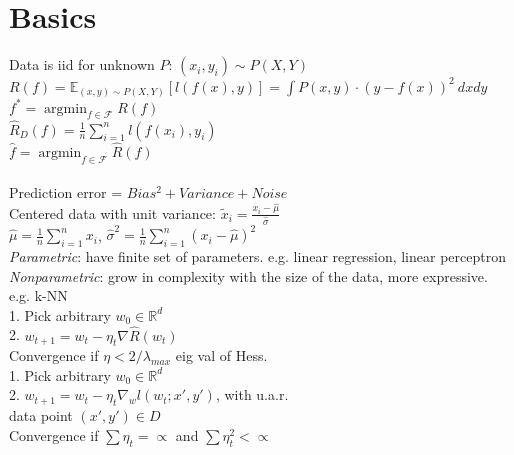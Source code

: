 
\section*{Basics}

Data is iid for unknown $P$: $(x_i, y_i) \sim P(X,Y)$\\
$R(f) = \mathbb{E}_{(x,y)\sim P(X,Y)}[l(f(x),y)] = \int P(x,y) \cdot (y-f(x))^2 \  dx dy$\\
$f^* = \operatorname{argmin}_{f\in\mathcal{F}} R(f)$\\
$\hat{R}_D (f) = \frac{1}{n} \sum_{i = 1}^{n} l (f(x_i),y_i) $\\
$\hat{f} = \operatorname{argmin}_{f\in\mathcal{F}} \hat{R}(f) $\\
\\
Prediction error = $Bias^2 + Variance + Noise$\\
Centered data with unit variance:
$\tilde{x}_{i} = \frac{x_{i}-\hat{\mu}}{\hat{\sigma}}$\\
$\hat{\mu} = \frac{1}{n}\sum_{i=1}^n x_{i}$, $\hat{\sigma}^2 = \frac{1}{n}\sum_{i=1}^n {(x_{i}-\hat{\mu})}^2$ \\
\emph{Parametric}: have finite set of parameters. 
e.g. linear regression, linear perceptron\\
\emph{Nonparametric}: grow in complexity with the size of the data, more expressive.
e.g. k-NN
\\
1. Pick arbitrary $w_0 \in \mathbb{R}^d$\\
2. $w_{t+1} = w_t - \eta_t \nabla \hat{R}(w_t)$\\
Convergence if $\eta < 2/\lambda_{max}$ eig val of Hess.
\\
1. Pick arbitrary $w_0 \in \mathbb{R}^d$\\
2. $w_{t+1} = w_t - \eta_t \nabla_w l(w_t;x',y')$, with u.a.r.\\ data point $(x',y') \in D$\\
Convergence if $\sum \eta_t = \propto$ and $\sum \eta_t ^2 < \propto$
